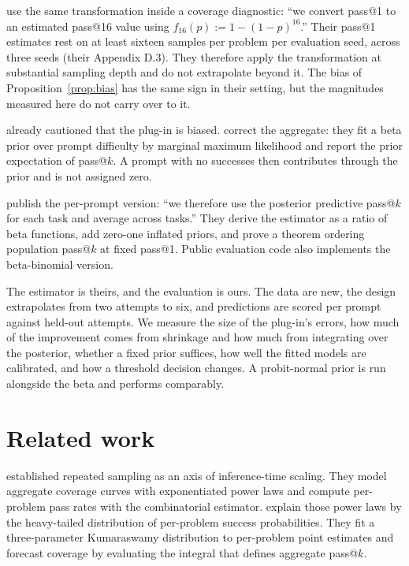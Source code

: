 \documentclass[11pt]{article}
\theoremstyle{itheads}
\begin{document}
\citet{malladi2026} use the same transformation inside a coverage
diagnostic: ``we convert pass@1 to an estimated pass@16 value using
$f_{16}(p):=1-(1-p)^{16}$.'' Their pass@1 estimates rest on at least
sixteen samples per problem per evaluation seed, across three seeds
(their Appendix D.3). They therefore apply the transformation at
substantial sampling depth and do not extrapolate beyond it. The
bias of Proposition~\ref{prop:bias} has the same sign in their
setting, but the magnitudes measured here do not carry over to it.

\citet{chen2021} already cautioned that the plug-in is biased.
\citet{kazdan2025} correct the aggregate: they fit a beta prior over
prompt difficulty by marginal maximum likelihood and report the
prior expectation of pass@$k$. A prompt with no successes then
contributes through the prior and is not assigned zero.

\citet{verine2026} publish the per-prompt version: ``we therefore
use the posterior predictive pass@$k$ for each task and average
across tasks.'' They derive the estimator as a ratio of beta
functions, add zero-one inflated priors, and prove a theorem
ordering population pass@$k$ at fixed pass@1. Public evaluation code
also implements the beta-binomial version.

The estimator is theirs, and the evaluation is ours. The data are
new, the design extrapolates from two attempts to six, and
predictions are scored per prompt against held-out attempts. We
measure the size of the plug-in's errors, how much of the
improvement comes from shrinkage and how much from integrating over
the posterior, whether a fixed prior suffices, how well the fitted
models are calibrated, and how a threshold decision changes. A
probit-normal prior is run alongside the beta and performs
comparably.

\section{Related work}

\citet{brown2024} established repeated sampling as an axis of
inference-time scaling. They model aggregate coverage curves with
exponentiated power laws and compute per-problem pass rates with the
combinatorial estimator. \citet{schaeffer2025} explain those power
laws by the heavy-tailed distribution of per-problem success
probabilities. They fit a three-parameter Kumaraswamy distribution
to per-problem point estimates and forecast coverage by evaluating
the integral that defines aggregate pass@$k$.
\end{document}
